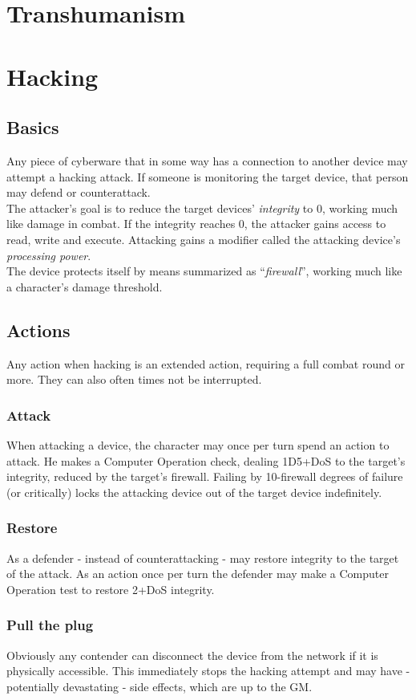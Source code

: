 \documentclass[12pt,a4paper,openany,usenames,dvipsnames]{book}
\begin{document}
	\chapter{Transhumanism}
	

	\chapter{Hacking}
	\section{Basics}
	Any piece of cyberware that in some way has a connection to another device may attempt a hacking attack. If someone is monitoring the target device, that person may defend or counterattack.\\
	The attacker’s goal is to reduce the target devices’ \emph{integrity} to 0, working much like damage in combat. If the integrity reaches 0, the attacker gains access to read, write and execute. Attacking gains a modifier called the attacking device’s \emph{processing power}.\\
	The device protects itself by means summarized as “\emph{firewall}”, working much like a character’s damage threshold.
	\section{Actions}
	Any action when hacking is an extended action, requiring a full combat round or more. They can also often times not be interrupted.
	\subsection*{Attack}
	When attacking a device, the character may once per turn spend an action to attack. He makes a Computer Operation check, dealing 1D5+DoS to the target’s integrity, reduced by the target’s firewall. Failing by 10-firewall degrees of failure (or critically) locks the attacking device out of the target device indefinitely.
	\subsection*{Restore}
	As a defender - instead of counterattacking - may restore integrity to the target of the attack. As an action once per turn the defender may make a Computer Operation test to restore 2+DoS integrity.
	\subsection*{Pull the plug}
	Obviously any contender can disconnect the device from the network if it is physically accessible. This immediately stops the hacking attempt and may have - potentially devastating - side effects, which are up to the GM.
\end{document}
